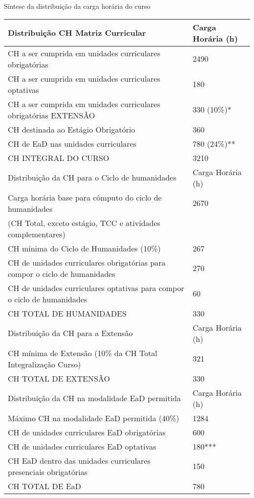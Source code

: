 \begin{quadro}[ht!]
\centering
\caption{Síntese da distribuição da carga horária do curso}

\small
\begin{tabular}{| l | l |}
\hline
\rowcolor{blue1}
Distribuição CH Matriz Curricular & Carga Horária (h)  \\
\hline
CH a ser  cumprida em unidades curriculares obrigatórias & 2490\\ \hline
CH a ser  cumprida em unidades curriculares optativas & 180\\ \hline
CH a ser cumprida em unidades curriculares obrigatórias EXTENSÃO & 330 (10\%)* \\\hline
CH destinada ao Estágio Obrigatório & 360 \\ \hline
CH de EaD nas unidades curriculares & 780 (24\%)** \\ \hline
CH  INTEGRAL DO CURSO & 3210\\ \hline
\rowcolor{blue1}
Distribuição da CH para o Ciclo de humanidades & Carga Horária (h)  \\
\hline
Carga horária base para cômputo do ciclo de humanidades & 2670\\
(CH Total, exceto estágio, TCC e atividades complementares) & \\ \hline
CH mínima do Ciclo de Humanidades (10\%) & 267 \\ \hline
CH de unidades curriculares obrigatórias para compor o ciclo de humanidades & 270 \\ \hline
CH de unidades curriculares optativas para compor o ciclo de humanidades & 60 \\ \hline
CH TOTAL DE HUMANIDADES & 330\\ \hline
\rowcolor{blue1}
Distribuição da CH para a Extensão & Carga Horária (h)  \\
\hline
CH mínima de Extensão (10\% da CH Total Integralização Curso) & 321\\ \hline
CH TOTAL DE EXTENSÃO & 330 \\ \hline
\rowcolor{blue1}
Distribuição da CH na modalidade EaD permitida & Carga Horária (h)  \\
\hline
Máximo CH na modalidade EaD permitida (40\%) & 1284\\ \hline
CH de unidades curriculares EaD obrigatórias & 600 \\ \hline
CH de unidades curriculares EaD optativas & 180***\\ \hline
CH EaD dentro das unidades curriculares presenciais obrigatórias & 150\\ \hline
CH TOTAL DE EaD & 780\\ \hline


\end{tabular}
\end{quadro}
